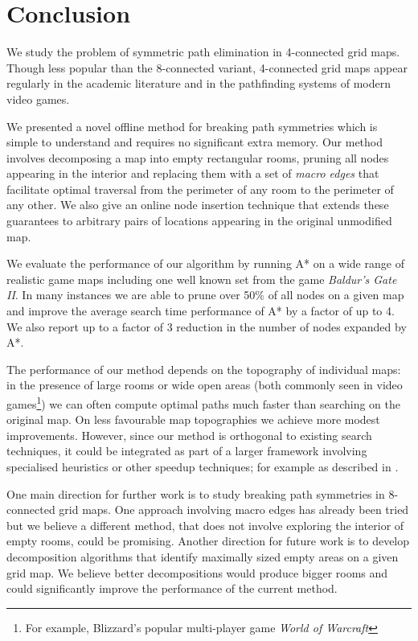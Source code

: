 \section{Conclusion}
We study the problem of symmetric path elimination in 4-connected grid maps.
Though less popular than the 8-connected variant, 4-connected grid maps appear 
regularly in the academic literature and in the pathfinding systems of modern
video games.
\par
We presented a novel offline method for breaking path symmetries which is simple
to understand and requires no significant extra memory. 
Our method involves decomposing a map into empty rectangular rooms, pruning all nodes
appearing in the interior and replacing them with a set of \emph{macro edges}
that facilitate optimal traversal from the perimeter of any room to the perimeter
of any other.
We also give an online node insertion technique that extends these guarantees
 to arbitrary pairs of locations appearing in the original unmodified map.
\par
We evaluate the performance of our algorithm by running A* on a wide
range of realistic game maps including one well known set from the game
\emph{Baldur's Gate II}. 
In many instances we are able to prune over 50\% of all nodes on a given map
and improve the average search time performance of A* by a factor of up to 4.
We also report up to a factor of 3 reduction in the number of nodes expanded
by A*.
\par
The performance of our method depends on the topography of individual maps: 
in the presence of large rooms or wide open areas (both commonly seen in video games\footnote{For 
example, Blizzard's popular multi-player game \emph{World of Warcraft}})
we can often compute optimal paths much faster than searching on the original map. 
On less favourable map topographies we achieve more modest improvements.
However, since our method is orthogonal to existing search techniques, it could be integrated
as part of a larger framework involving specialised heuristics or other speedup techniques; 
for example as described in \cite{botea04,bjornsson05,bjornsson06}. 
\par
One main direction for further work is to study breaking path symmetries
in 8-connected grid maps.
One approach involving macro edges has already been tried 
\cite{bolanca09} but we believe a different method, that does not involve
exploring the interior of empty rooms, could be promising.
Another direction for future work is to develop decomposition algorithms that identify maximally
sized empty areas on a given grid map.
We believe better decompositions would produce bigger rooms and could significantly improve 
the performance of the current method.

